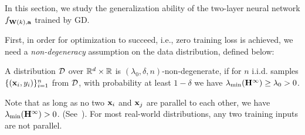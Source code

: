 

In this section, we study the generalization ability of the two-layer neural network $f_{\mathbf{W}(k), \mathbf{a}}$ trained by GD.


First, in order for optimization to succeed, i.e., zero training loss is achieved,
we need a \emph{non-degeneracy} assumption on the data distribution, defined below:
\begin{defn} \label{def:non-degenerate distribution}
	A distribution $\mathcal{D}$ over $\mathbb{R}^d \times \mathbb{R}$ is $(\lambda_0, \delta, n)$-non-degenerate, if for $n$ i.i.d. samples $\{(\mathbf{x}_i, y_i)\}_{i=1}^n$ from $\mathcal{D}$, with probability at least $1-\delta$ we have $\lambda_{\min}(\mathbf{H}^\infty) \ge \lambda_0 >0$.
\end{defn}
\begin{rem}
	Note that as long as no two $\mathbf{x}_i$ and $\mathbf{x}_j$ are parallel to each other, we have $\lambda_{\min}(\mathbf{H}^\infty) > 0$. (See~\citep{du2018provably}).
	For most real-world distributions, any two training inputs are not parallel.
\end{rem}

